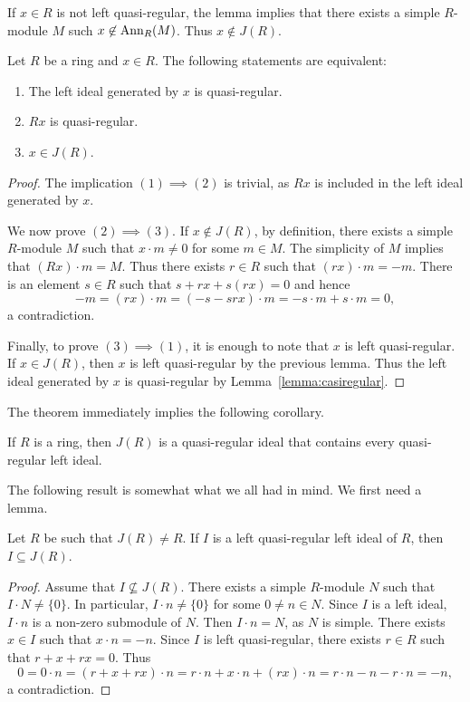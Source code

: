 If $x\in R$ is not left quasi-regular, the lemma implies that there exists 
a simple $R$-module $M$ such $x\not\in\operatorname{Ann}_R(M)$. Thus 
$x\not\in J(R)$.

\begin{theorem}
	\label{thm:casireg_eq}
	Let $R$ be a ring and $x\in R$. The following statements are equivalent: 
	\begin{enumerate}
		\item The left ideal generated by $x$ is quasi-regular.
		\item $Rx$ is quasi-regular.
		\item $x\in J(R)$.
	\end{enumerate}
\end{theorem}

\begin{proof}
	The implication $(1)\implies(2)$ is trivial, as $Rx$ is included in the left ideal 
	generated by $x$.  
	
	We now prove $(2)\implies(3)$. If
	$x\not\in J(R)$, by definition, there exists a simple 
	$R$-module $M$ such that $x\cdot m\ne 0$ for some $m\in M$. The simplicity of $M$ implies
	that $(Rx)\cdot m=M$. Thus there exists $r\in R$ such that $(rx)\cdot m=-m$. There is an element 
	$s\in R$ such that $s+rx+s(rx)=0$ and hence 
	\[
	-m=(rx)\cdot m=(-s-srx)\cdot m=-s\cdot m+s\cdot m=0,
	\]
	a contradiction. 
	
	Finally, to prove $(3)\implies(1)$, it is enough to note that 
	$x$ is left quasi-regular. If $x\in J(R)$, 
	then $x$ is left quasi-regular by 
	the previous lemma. 
	Thus the left ideal generated by 
	$x$ is quasi-regular by Lemma~\ref{lemma:casiregular}.
\end{proof}

The theorem immediately implies the following corollary. 

\begin{corollary}
	If $R$ is a ring, then $J(R)$ is a quasi-regular ideal that contains every 
	quasi-regular left ideal. 
\end{corollary}

The following result is somewhat what we all had in mind. We first need a lemma. 

\begin{lemma}
    \label{lemma:JsupsetCR}
    Let $R$ be such that $J(R)\ne R$. If $I$ is a left quasi-regular left 
    ideal of $R$, then $I\subseteq J(R)$.
\end{lemma}

\begin{proof}
    Assume that $I\not\subseteq J(R)$. There exists a simple $R$-module 
    $N$ such that $I\cdot N\ne \{0\}$. In particular, $I\cdot n\ne \{0\}$ for some $0\ne n\in N$. Since 
    $I$ is a left ideal, $I\cdot n$ is a non-zero submodule of $N$. 
    Then $I\cdot n=N$, as $N$ is simple. There exists $x\in I$ such that $x\cdot n=-n$. 
    Since $I$ is left quasi-regular, there exists $r\in R$ such that $r+x+rx=0$.
    Thus 
    \[
	0=0\cdot n=(r+x+rx)\cdot n=r\cdot n+x\cdot n+(rx)\cdot n=r\cdot n-n-r\cdot n=-n,
    \]
    a contradiction. 
\end{proof}


